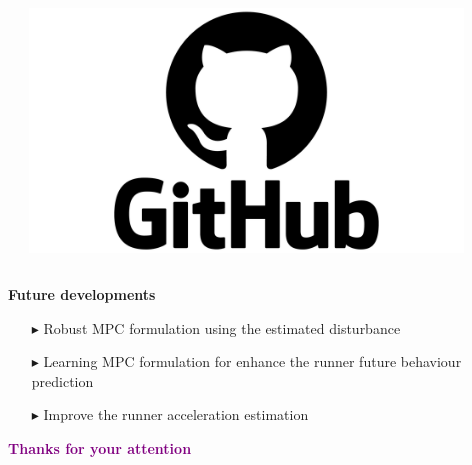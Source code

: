 \documentclass[9pt, aspectratio=169]{beamer}
\begin{document}
\begin{frame}
\begin{columns}
\begin{column}{0.4\textwidth}
\begin{columns}
\begin{column}{0.2\textwidth}
\begin{center}
	\end{center}
\end{column}
\hspace{-0.6cm}
\begin{column}{0.2\textwidth}
	\begin{center}
  		\includegraphics[width=0.9\textwidth]{GitHub} 
	\end{center}
\end{column}
\end{columns}

\end{column}
\end{columns}

\textcolor{emph@Thesis}{\textbf{\small{Future developments}}} 
\vspace{0.2cm}
\begin{itemize}
	\footnotesize
	\item[$\blacktriangleright$] Robust MPC formulation using the estimated disturbance
	\item[$\blacktriangleright$] Learning MPC formulation for enhance the runner future behaviour prediction	
	\item[$\blacktriangleright$] Improve the runner acceleration estimation
\end{itemize}

\vspace{0.8cm} \hspace{5cm} \textcolor{purple}{\textbf{\small{Thanks for your attention}}} 
\end{frame}

\begin{frame}
\end{frame}
\end{document}
